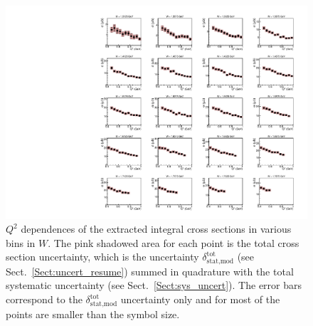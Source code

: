 \begin{figure}[htp]
\begin{center}
\includegraphics[width=\textwidth]{pictures/conclusion/q2dep_20Jul2021.pdf}
\caption{\small $Q^{2}$ dependences of the extracted integral cross sections in various bins in $W$. The pink shadowed area for each point is the total cross section uncertainty, which is the uncertainty $\delta_{\text{stat,mod}}^{\text{tot}}$ (see Sect.~\ref{Sect:uncert_resume}) summed in quadrature with the total systematic uncertainty (see Sect.~\ref{Sect:sys_uncert}). The error bars correspond to the $\delta_{\text{stat,mod}}^{\text{tot}}$ uncertainty only and for most of the points are smaller than the symbol size.  } \label{fig:int_q2_dep}
\end{center}
\end{figure}


